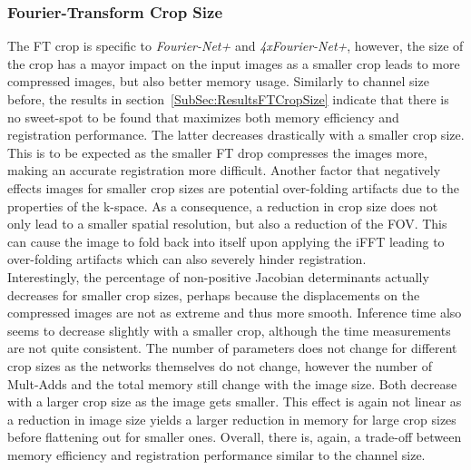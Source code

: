 \subsubsection{Fourier-Transform Crop Size} \label{SubSubSec:DiscussionFTCropSize}
The FT crop is specific to \emph{Fourier-Net+} and \emph{4xFourier-Net+}, however, the size of the crop has a mayor impact on the input images as a smaller crop leads to more compressed images, but also better memory usage. Similarly to channel size before, the results in section~\ref{SubSec:ResultsFTCropSize} indicate that there is no sweet-spot to be found that maximizes both memory efficiency and registration performance. The latter decreases drastically with a smaller crop size. This is to be expected as the smaller FT drop compresses the images more, making an accurate registration more difficult. Another factor that negatively effects images for smaller crop sizes are potential over-folding artifacts due to the properties of the k-space. As a consequence, a reduction in crop size does not only lead to a smaller spatial resolution, but also a reduction of the FOV. This can cause the image to fold back into itself upon applying the iFFT leading to over-folding artifacts which can also severely hinder registration. \\
Interestingly, the percentage of non-positive Jacobian determinants actually decreases for smaller crop sizes, perhaps because the displacements on the compressed images are not as extreme and thus more smooth. Inference time also seems to decrease slightly with a smaller crop, although the time measurements are not quite consistent. The number of parameters does not change for different crop sizes as the networks themselves do not change, however the number of Mult-Adds and the total memory still change with the image size. Both decrease with a larger crop size as the image gets smaller. This effect is again not linear as a reduction in image size yields a larger reduction in memory for large crop sizes before flattening out for smaller ones. Overall, there is, again, a trade-off between memory efficiency and registration performance similar to the channel size.

